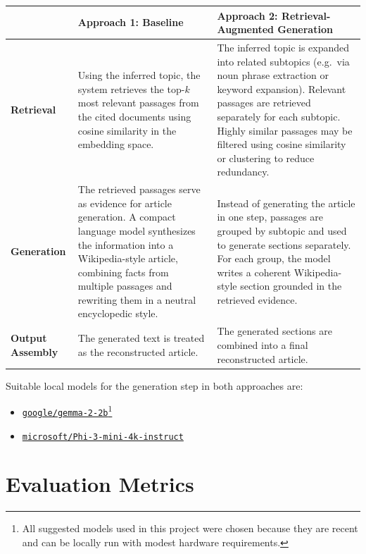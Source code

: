 \documentclass[10pt,a4paper]{article}
\begin{document}
\renewcommand{\arraystretch}{1.2}
\begin{tabularx}{\textwidth}{|>{\raggedright\arraybackslash}p{}|>{\raggedright\arraybackslash}X|>{\raggedright\arraybackslash}X|}
\hline
\textbf{} & \textbf{Approach 1: Baseline} & \textbf{Approach 2: Retrieval-Augmented Generation} \\
\hline
\textbf{Retrieval} &
Using the inferred topic, the system retrieves the top-$k$ most relevant passages from the cited documents using cosine similarity in the embedding space. &
The inferred topic is expanded into related subtopics (e.g.\ via noun phrase extraction or keyword expansion). Relevant passages are retrieved separately for each subtopic. Highly similar passages may be filtered using cosine similarity or clustering to reduce redundancy. \\
\hline
\textbf{Generation} &
The retrieved passages serve as evidence for article generation. A compact language model synthesizes the information into a Wikipedia-style article, combining facts from multiple passages and rewriting them in a neutral encyclopedic style. &
Instead of generating the article in one step, passages are grouped by subtopic and used to generate sections separately. For each group, the model writes a coherent Wikipedia-style section grounded in the retrieved evidence. \\
\hline
\textbf{Output Assembly} &
The generated text is treated as the reconstructed article. &
The generated sections are combined into a final reconstructed article. \\
\hline
\end{tabularx}

\vspace{0.5em}

Suitable local models for the generation step in both approaches are:
\begin{itemize}
    \item \href{https://huggingface.co/google/gemma-2-2b}{\texttt{google/gemma-2-2b}}\footnote{\label{ftnt:models_gen}All suggested models used in this project were chosen because they are recent and can be locally run with modest hardware requirements.}
    \item \href{https://huggingface.co/microsoft/Phi-3-mini-4k-instruct}{\texttt{microsoft/Phi-3-mini-4k-instruct}}
\end{itemize}

\section{Evaluation Metrics}
\end{document}
